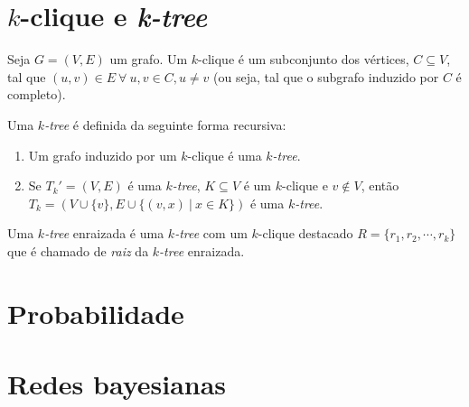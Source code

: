 \section{$k$-clique e \emph{k-tree}}

\begin{definition}[$k$-clique]
  \label{def:kclique}
  \cite{bondy} Seja $G = (V, E)$ um grafo. Um $k$-clique é um subconjunto dos vértices, $C \subseteq V$, tal que $(u, v) \in E \ \forall \ u, v \in C, u \neq v$ (ou seja, tal que o subgrafo induzido por $C$ é completo).
\end{definition}

\begin{definition}
  \label{def:ktree}
  \cite{harary} Uma \emph{$k$-tree} é definida da seguinte forma recursiva:

  \begin{enumerate}
    \item Um grafo induzido por um $k$-clique é uma \emph{$k$-tree}.
    \item Se $T_k' = (V, E)$ é uma \emph{$k$-tree}, $K \subseteq V$ é um $k$-clique e $v \not \in V$, então $T_k = (V \cup \{v\}, E \cup \{(v,x) \ | \  x \in K\})$ é uma \emph{$k$-tree}.
  \end{enumerate}
\end{definition}

\begin{definition}
  \label{def:rootedktree}
  \cite{caminiti} Uma \emph{$k$-tree} enraizada é uma \emph{$k$-tree} com um $k$-clique destacado $R = \{r_1, r_2, \cdots, r_k\}$ que é chamado de \emph{raiz} da \emph{$k$-tree} enraizada.
\end{definition}

\section{Probabilidade}

\cite{koller}

\section{Redes bayesianas}

\cite{koller}
